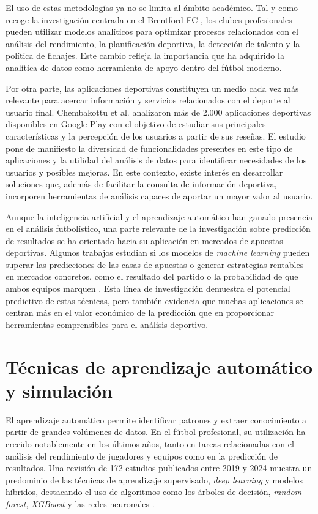El uso de estas metodologías ya no se limita al ámbito académico. Tal y como recoge la investigación centrada en el Brentford FC \cite{kane_how_2026}, los clubes profesionales pueden utilizar modelos analíticos para optimizar procesos relacionados con el análisis del rendimiento, la planificación deportiva, la detección de talento y la política de fichajes. Este cambio refleja la importancia que ha adquirido la analítica de datos como herramienta de apoyo dentro del fútbol moderno.

Por otra parte, las aplicaciones deportivas constituyen un medio cada vez más relevante para acercar información y servicios relacionados con el deporte al usuario final. Chembakottu et al. \cite{chembakottu_large-scale_2023} analizaron más de 2.000 aplicaciones deportivas disponibles en Google Play con el objetivo de estudiar sus principales características y la percepción de los usuarios a partir de sus reseñas. El estudio pone de manifiesto la diversidad de funcionalidades presentes en este tipo de aplicaciones y la utilidad del análisis de datos para identificar necesidades de los usuarios y posibles mejoras. En este contexto, existe interés en desarrollar soluciones que, además de facilitar la consulta de información deportiva, incorporen herramientas de análisis capaces de aportar un mayor valor al usuario.

Aunque la inteligencia artificial y el aprendizaje automático han ganado presencia en el análisis futbolístico, una parte relevante de la investigación sobre predicción de resultados se ha orientado hacia su aplicación en mercados de apuestas deportivas. Algunos trabajos estudian si los modelos de \textit{machine learning} pueden superar las predicciones de las casas de apuestas o generar estrategias rentables en mercados concretos, como el resultado del partido o la probabilidad de que ambos equipos marquen \cite{DACOSTA2022895, HUBACEK2019783}. Esta línea de investigación demuestra el potencial predictivo de estas técnicas, pero también evidencia que muchas aplicaciones se centran más en el valor económico de la predicción que en proporcionar herramientas comprensibles para el análisis deportivo.

\section{Técnicas de aprendizaje automático y simulación}

El aprendizaje automático permite identificar patrones y extraer conocimiento a partir de grandes volúmenes de datos. En el fútbol profesional, su utilización ha crecido notablemente en los últimos años, tanto en tareas relacionadas con el análisis del rendimiento de jugadores y equipos como en la predicción de resultados. Una revisión de 172 estudios publicados entre 2019 y 2024 muestra un predominio de las técnicas de aprendizaje supervisado, \textit{deep learning} y modelos híbridos, destacando el uso de algoritmos como los árboles de decisión, \textit{random forest}, \textit{XGBoost} y las redes neuronales \cite{moya_machine_2025}.

